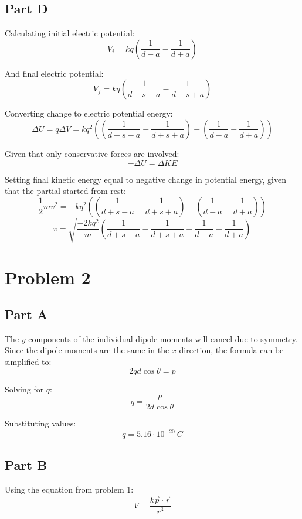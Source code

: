 \documentclass{article}
\begin{document}
\subsection*{Part D}

Calculating initial electric potential:
$$ V_{i} = kq \left( \frac{ 1 }{ d - a } - \frac{ 1 }{ d + a } \right) $$

And final electric potential:
$$ V_{f} = kq \left( \frac{ 1 }{ d + s - a } - \frac{ 1 }{ d + s + a } \right) $$

Converting change to electric potential energy:
$$ \Delta U = q \Delta V = k q^{2} \left( \left( \frac{ 1 }{ d + s - a } -
\frac{ 1 }{ d + s + a } \right) - \left( \frac{ 1 }{ d - a } - \frac{ 1 }{ d + a
} \right)\right) $$

Given that only conservative forces are involved:
$$ -\Delta U = \Delta KE $$

Setting final kinetic energy equal to negative change in potential energy, given
that the partial started from rest:
$$ \frac{ 1 }{ 2 } m v^{2} = -k q^{2} \left( \left( \frac{ 1 }{ d + s - a } -
\frac{ 1 }{ d + s + a } \right) - \left( \frac{ 1 }{ d - a } - \frac{ 1 }{ d + a
} \right)\right) $$
$$ v = \sqrt{\frac{ -2 k q^{2}}{m} \left( \frac{ 1 }{ d + s - a } -
\frac{ 1 }{ d + s + a } - \frac{ 1 }{ d - a } + \frac{ 1 }{ d + a
} \right)} $$

\section*{Problem 2}

\subsection*{Part A}

The $y$ components of the individual dipole moments will cancel due to symmetry.
Since the dipole moments are the same in the $x$ direction, the formula can be
simplified to:
$$ 2 q d \cos \theta = p $$

Solving for $q$:
$$ q = \frac{ p }{ 2 d \cos \theta } $$

Substituting values:
$$ q = 5.16 \cdot 10^{-20}\ \si{C} $$

\subsection*{Part B}

Using the equation from problem 1:
$$ V = \frac{ k \vec{p} \cdot \vec{r} }{ r^{3} } $$
\end{document}
